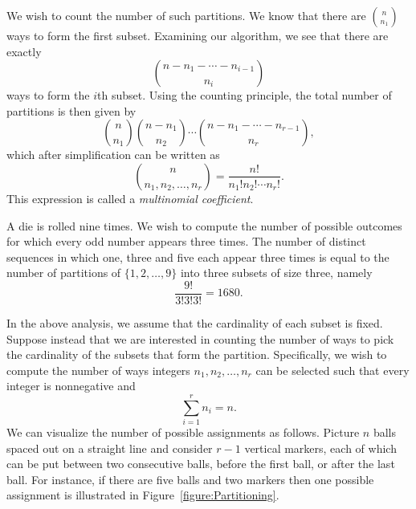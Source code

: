 We wish to count the number of such partitions.
We know that there are $\binom{n}{n_1}$ ways to form the first subset.
Examining our algorithm, we see that there are exactly
\begin{equation*}
\binom{n - n_1 - \cdots - n_{i-1}}{n_i}
\end{equation*}
ways to form the $i$th subset.
Using the counting principle, the total number of partitions is then given by
\begin{equation*}
\binom{n}{n_1} \binom{n - n_1}{n_2}
\cdots \binom{n - n_1 - \cdots - n_{r-1}}{n_r},
\end{equation*}
which after simplification can be written as
\begin{equation*}
\binom{n}{n_1, n_2, \ldots, n_r}
= \frac{n!}{n_1! n_2! \cdots n_r!} .
\end{equation*}
This expression is called a \emph{multinomial coefficient}. 

\begin{example}
A die is rolled nine times.
We wish to compute the number of possible outcomes for which every odd number appears three times.
The number of distinct sequences in which one, three and five each appear three times is equal to the number of partitions of $\{ 1, 2, \ldots, 9 \}$ into three subsets of size three, namely
\begin{equation*}
\frac{9!}{3! 3! 3!} = 1680 .
\end{equation*}
\end{example}

In the above analysis, we assume that the cardinality of each subset is fixed.
Suppose instead that we are interested in counting the number of ways to pick the cardinality of the subsets that form the partition. 
Specifically, we wish to compute the number of ways integers $n_1, n_2, \ldots, n_r$ can be selected such that every integer is nonnegative and
\begin{equation*}
\sum_{i = 1}^r n_i = n.
\end{equation*}
We can visualize the number of possible assignments as follows.
Picture $n$ balls spaced out on a straight line and consider $r-1$ vertical markers, each of which can be put between two consecutive balls, before the first ball, or after the last ball. 
For instance, if there are five balls and two markers then one possible assignment is illustrated in Figure~\ref{figure:Partitioning}.

